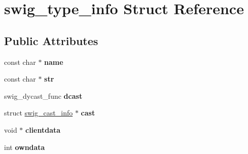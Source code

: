 \hypertarget{structswig__type__info}{
\section{swig\_\-type\_\-info Struct Reference}
\label{dd/dee/structswig__type__info}
}
\subsection*{Public Attributes}
\begin{DoxyCompactItemize}
\item 
\hypertarget{structswig__type__info_aa6c9f9ed3037043b6d346162cf932daf}{
const char $\ast$ {\bfseries name}}
\label{dd/dee/structswig__type__info_aa6c9f9ed3037043b6d346162cf932daf}

\item 
\hypertarget{structswig__type__info_aaafd19f362ddc521d6a846ce41044471}{
const char $\ast$ {\bfseries str}}
\label{dd/dee/structswig__type__info_aaafd19f362ddc521d6a846ce41044471}

\item 
\hypertarget{structswig__type__info_a07df4bedf85be77b23756b531b60e0dd}{
swig\_\-dycast\_\-func {\bfseries dcast}}
\label{dd/dee/structswig__type__info_a07df4bedf85be77b23756b531b60e0dd}

\item 
\hypertarget{structswig__type__info_ae535f16234db99893f07880cb94a848e}{
struct \hyperlink{structswig__cast__info}{swig\_\-cast\_\-info} $\ast$ {\bfseries cast}}
\label{dd/dee/structswig__type__info_ae535f16234db99893f07880cb94a848e}

\item 
\hypertarget{structswig__type__info_a2e1f9087e639dd7c8c131fbc6e399194}{
void $\ast$ {\bfseries clientdata}}
\label{dd/dee/structswig__type__info_a2e1f9087e639dd7c8c131fbc6e399194}

\item 
\hypertarget{structswig__type__info_a93c25d5903cbfcb82208eea7227c32bd}{
int {\bfseries owndata}}
\label{dd/dee/structswig__type__info_a93c25d5903cbfcb82208eea7227c32bd}

\end{DoxyCompactItemize}


